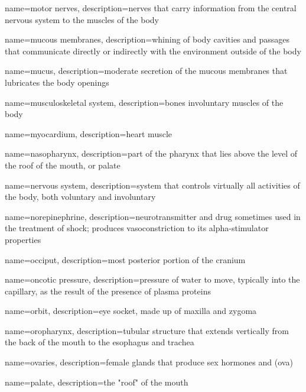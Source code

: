 \documentclass[../../EMT-169.tex]{subfiles}
\begin{document}
	{
		name=motor nerves,
		description={nerves that carry information from the central nervous system to the muscles of the body}
	}
	
	{
		name=mucous membranes,
		description={whining of body cavities and passages that communicate directly or indirectly with the environment outside of the body}
	}
	
	{
		name=mucus,
		description={moderate secretion of the mucous membranes that lubricates the body openings}
	}
	
	{
		name=musculoskeletal system,
		description={bones involuntary muscles of the body}
	}
	
	{
		name=myocardium,
		description={heart muscle}
	}
	
	{
		name=nasopharynx,
		description={part of the pharynx that lies above the level of the roof of the mouth, or palate}
	}
	
	{
		name=nervous system,
		description={system that controls virtually all activities of the body, both voluntary and involuntary}
	}
	
	{
		name=norepinephrine,
		description={neurotransmitter and drug sometimes used in the treatment of shock; produces vasoconstriction to its alpha-stimulator properties}
	}
	
	{
		name=occiput,
		description={most posterior portion of the cranium}
	}
	
	{
		name=oncotic pressure,
		description={pressure of water to move, typically into the capillary, as the result of the presence of plasma proteins}
	}
	
	{
		name=orbit,
		description={eye socket, made up of maxilla and zygoma}
	}
	
	{
		name=oropharynx,
		description={tubular structure that extends vertically from the back of the mouth to the esophagus and trachea}
	}
	
	{
		name=ovaries,
		description={female glands that produce sex hormones and (ova)}
	}
	
	{
		name=palate,
		description={the "roof" of the mouth}
	}
	
\end{document}
